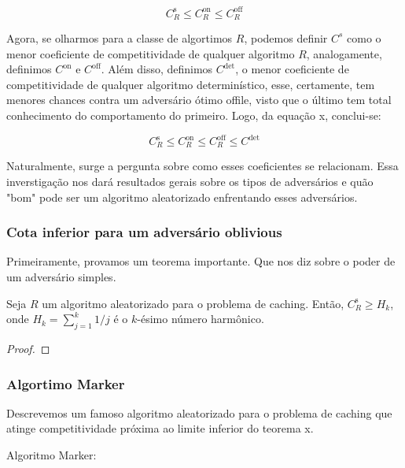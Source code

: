 \begin{equation}
  C_R^{\text{s}} \leqslant C_R^{\text{on}} \leqslant C_R^{\text{off}}
\end{equation}

Agora, se olharmos para a classe de algortimos \(R\), podemos definir \(C^{s}\) como o menor coeficiente de competitividade de qualquer algoritmo \(R\), analogamente, definimos \(C^\text{{on}}\) e \(C^\text{{off}}\). Além disso, definimos \(C^{\text{det}}\), o menor coeficiente de competitividade de qualquer algoritmo determinístico, esse, certamente, tem menores chances contra um adversário ótimo offile, visto que o último tem total conhecimento do comportamento do primeiro. Logo, da equação x, conclui-se:

\begin{equation}
  C_R^{\text{s}} \leqslant C_R^{\text{on}} \leqslant C_R^{\text{off}} \leqslant C^{\text{det}}
\end{equation}

Naturalmente, surge a pergunta sobre como esses coeficientes se relacionam. Essa inverstigação nos dará resultados gerais sobre os tipos de adversários e quão "bom" pode ser um algoritmo aleatorizado enfrentando esses adversários.


\subsubsection{Cota inferior para um adversário oblivious}

Primeiramente, provamos um teorema importante. Que nos diz sobre o poder de um adversário simples.

\begin{theorem}
  Seja \(R\) um algoritmo aleatorizado para o problema de caching. Então, \(C_R^{\text{s}} \geqslant H_k\), onde \(H_k = \sum_{j = 1}^{k} 1/j\) é o \(k\)-ésimo número harmônico.
  \begin{proof}
  \end{proof}
\end{theorem}


\subsubsection{Algortimo Marker}

Descrevemos um famoso algoritmo aleatorizado para o problema de caching que atinge competitividade próxima ao limite inferior do teorema x.

Algoritmo Marker: 

